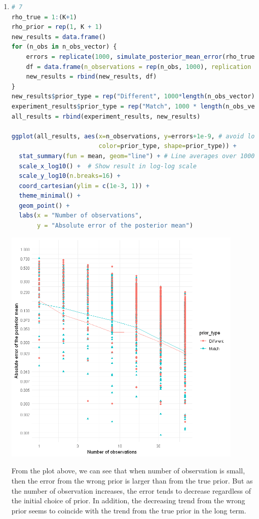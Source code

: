 \documentclass{article}
\begin{document}
\begin{enumerate}
\item 
\begin{lstlisting}[language=R]
# 7  
rho_true = 1:(K+1)
rho_prior = rep(1, K + 1)
new_results = data.frame()
for (n_obs in n_obs_vector) {
    errors = replicate(1000, simulate_posterior_mean_error(rho_true, rho_prior, n_obs))
    df = data.frame(n_observations = rep(n_obs, 1000), replication = (1:1000), errors = errors)
    new_results = rbind(new_results, df)
}
new_results$prior_type = rep("Different", 1000*length(n_obs_vector))
experiment_results$prior_type = rep("Match", 1000 * length(n_obs_vector))
all_results = rbind(experiment_results, new_results)

ggplot(all_results, aes(x=n_observations, y=errors+1e-9, # avoid log(0) 
                        color=prior_type, shape=prior_type)) + 
  stat_summary(fun = mean, geom="line") + # Line averages over 1000 replicates
  scale_x_log10() +  # Show result in log-log scale
  scale_y_log10(n.breaks=16) +
  coord_cartesian(ylim = c(1e-3, 1)) +
  theme_minimal() +
  geom_point() +
  labs(x = "Number of observations",
       y = "Absolute error of the posterior mean")
\end{lstlisting}

\includegraphics[width=0.9\textwidth]{two_errors.png}

From the plot above, we can see that when number of observation is small, then the error from the wrong prior is larger than from the true prior.
But as the number of observation increases, the error tends to decrease regardless of the initial choice of prior. In addition, the decreasing trend from the wrong prior seems to coincide with the trend from the true prior in the long term.




\end{enumerate}










 
\end{document}
